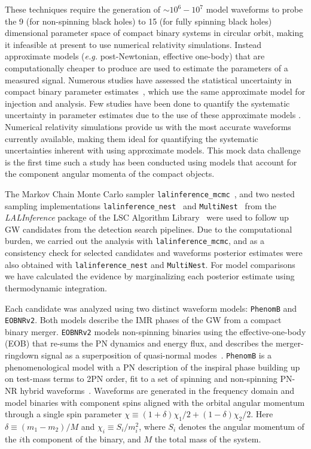 \documentclass[12pt]{iopart}
\newcommand{\eob}{\texttt{EOBNRv2}\xspace}
\newcommand{\imr}{\texttt{PhenomB}\xspace}
\begin{document}
These techniques require the generation of $\sim 10^6 - 10^7$ model waveforms
to probe the 9 (for non-spinning black holes) to 15 (for fully spinning black
holes) dimensional parameter space of compact binary systems in circular orbit,
making it infeasible at present to use numerical relativity simulations.
Instead approximate models (\textit{e.g.} post-Newtonian, effective one-body)
that are computationally cheaper to produce are used to estimate the parameters
of a measured signal. Numerous studies have assessed the statistical
uncertainty in compact binary parameter
estimates~\cite{vanderSluys:2009bf,Raymond:2008im,Veitch:2009hd,   
Raymond:2009cv}, which use the same approximate model for injection and
analysis. Few studies have been done to quantify the systematic uncertainty in
parameter estimates due to the use of these approximate models
\cite{Canitrot:2001hc,Cutler:2007mi}. Numerical relativity simulations
provide us with the most accurate waveforms currently available, making them
ideal for quantifying the systematic uncertainties inherent with using
approximate models.  This mock data challenge is the first time such a study
has been conducted using models that account for the component angular momenta
of the compact objects.

The Markov Chain Monte Carlo sampler
\texttt{lalinference\_mcmc}~\cite{vanderSluys:2007st,vanderSluys:2008qx}, and
two nested sampling implementations
\texttt{lalinference\_nest}~\cite{Veitch:2009hd} and
\texttt{MultiNest}~\cite{Feroz:2008xx} from the \textit{LALInference} package
of the LSC Algorithm Library~\cite{LAL} were used to follow up GW candidates
from the detection search pipelines. Due to the computational burden, we carried
out the analysis with \texttt{lalinference\_mcmc}, and as a consistency check
for selected candidates and waveforms posterior estimates were also obtained
with \texttt{lalinference\_nest} and \texttt{MultiNest}. For model comparisons
we have calculated the evidence by marginalizing each posterior estimate using
thermodynamic integration.

Each candidate was analyzed using two distinct waveform models: \imr and
\eob.  Both models describe the IMR phases of the GW from a compact binary 
merger.  \eob models
non-spinning binaries using the effective-one-body (EOB) 
that re-sums the PN dynamics and energy flux, and describes 
the merger-ringdown signal as a superposition of 
quasi-normal modes~\cite{Pan:2011gk}. \imr is a
phenomenological model with a PN description of the inspiral phase
building up on test-mass terms to 2PN order, fit to a set of spinning and 
non-spinning PN-NR hybrid waveforms~\cite{Ajith:2009bn}.  Waveforms are 
generated in the frequency
domain and model binaries with component spins aligned with the orbital
angular momentum through a single spin parameter $\chi \equiv
(1+\delta)\chi_1/2 + (1-\delta)\chi_2/2$. Here $\delta \equiv (m_1-m_2)/M$ and
$\chi_i\equiv S_i/m_i^2$, where $S_i$ denotes the angular momentum of the $i$th
component of the binary, and $M$ the total mass of the system. 
\end{document}
